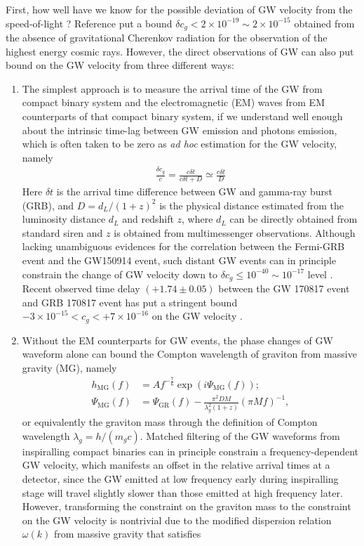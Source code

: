 \documentclass[aps,prd,twocolumn,10pt,groupedaddress]{revtex4-1}
\begin{document}
First, how well have we know for the possible deviation of GW velocity from the speed-of-light ? Reference \cite{Moore:2001bv} put a bound $\delta c_g<2\times10^{-19}\sim2\times10^{-15}$ obtained from the absence of gravitational Cherenkov radiation for the observation of the highest energy cosmic rays. However, the direct observations of GW can also put bound on the GW velocity from three different ways:
\begin{enumerate}
  \item The simplest approach is to measure the arrival time of the GW from compact binary system and the electromagnetic (EM) waves from EM counterparts of that compact binary system, if we understand well enough about the intrinsic time-lag between GW emission and photons emission, which is often taken to be zero as \textit{ad hoc} estimation for the GW velocity, namely
      \begin{align}
      \frac{\delta c_g}{c}=\frac{c\delta t}{c\delta t+D}\simeq\frac{c\delta t}{D}
      \end{align}
      Here $\delta t$ is the arrival time difference between GW and gamma-ray burst (GRB), and $D=d_L/(1+z)^2$ is the physical distance estimated from the luminosity distance $d_L$ and redshift $z$, where $d_L$ can be directly obtained from standard siren and $z$ is obtained from multimessenger observations. Although lacking unambiguous evidences for the correlation between the Fermi-GRB event \cite{Connaughton:2016umz} and the GW150914 \cite{Abbott:2016blz} event, such distant GW events can in principle constrain the change of GW velocity down to $\delta c_g\leq10^{-40}\sim10^{-17}$ level \cite{Li:2016iww,Ellis:2016rrr,Branchina:2016gad}. Recent observed time delay $(+1.74\pm0.05)$ between the GW 170817 event \cite{TheLIGOScientific:2017qsa} and GRB 170817 event \cite{Goldstein:2017mmi,Savchenko:2017ffs} has put a stringent bound $-3\times10^{-15}<c_g<+7\times10^{-16}$ on the GW velocity \cite{Monitor:2017mdv}.
  \item Without the EM counterparts for GW events, the phase changes of GW waveform alone \cite{Will:1997bb,DelPozzo:2011pg} can bound the Compton wavelength of graviton from massive gravity (MG), namely
      \begin{align}
      h_\mathrm{MG}(f)&=Af^{-\frac76}\exp(i\Psi_\mathrm{MG}(f));\\
      \Psi_\mathrm{MG}(f)&=\Psi_\mathrm{GR}(f)-\frac{\pi^2DM}{\lambda_g^2(1+z)}(\pi Mf)^{-1},
      \end{align}
       or equivalently the graviton mass \cite{TheLIGOScientific:2016src} through the definition of Compton wavelength $\lambda_g=h/(m_gc)$. Matched filtering of the GW waveforms from inspiralling compact binaries can in principle constrain a frequency-dependent GW velocity, which manifests an offset in the relative arrival times at a detector, since the GW emitted at low frequency early during inspiralling stage will travel slightly slower than those emitted at high frequency later. However, transforming the constraint on the graviton mass to the constraint on the GW velocity is nontrivial due to the modified dispersion relation $\omega(k)$ from massive gravity that satisfies

\end{enumerate}
\end{document}
